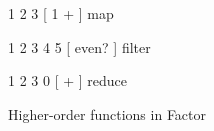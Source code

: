 \centering

  \begin{factorcode}
    { 1 2 3 } [ 1 + ] map

    { 1 2 3 4 5 } [ even? ] filter

    { 1 2 3 } 0 [ + ] reduce
  \end{factorcode}

\caption{Higher-order functions in Factor}
